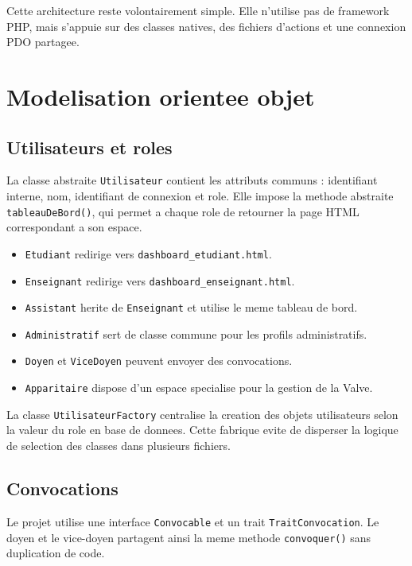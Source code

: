 \documentclass[12pt,a4paper]{article}
\begin{document}
Cette architecture reste volontairement simple. Elle n'utilise pas de framework PHP, mais s'appuie sur des classes natives, des fichiers d'actions et une connexion PDO partagee.

\section{Modelisation orientee objet}

\subsection{Utilisateurs et roles}

La classe abstraite \texttt{Utilisateur} contient les attributs communs : identifiant interne, nom, identifiant de connexion et role. Elle impose la methode abstraite \texttt{tableauDeBord()}, qui permet a chaque role de retourner la page HTML correspondant a son espace.

\begin{itemize}
    \item \texttt{Etudiant} redirige vers \texttt{dashboard\_etudiant.html}.
    \item \texttt{Enseignant} redirige vers \texttt{dashboard\_enseignant.html}.
    \item \texttt{Assistant} herite de \texttt{Enseignant} et utilise le meme tableau de bord.
    \item \texttt{Administratif} sert de classe commune pour les profils administratifs.
    \item \texttt{Doyen} et \texttt{ViceDoyen} peuvent envoyer des convocations.
    \item \texttt{Apparitaire} dispose d'un espace specialise pour la gestion de la Valve.
\end{itemize}

La classe \texttt{UtilisateurFactory} centralise la creation des objets utilisateurs selon la valeur du role en base de donnees. Cette fabrique evite de disperser la logique de selection des classes dans plusieurs fichiers.

\subsection{Convocations}

Le projet utilise une interface \texttt{Convocable} et un trait \texttt{TraitConvocation}. Le doyen et le vice-doyen partagent ainsi la meme methode \texttt{convoquer()} sans duplication de code.
\end{document}
